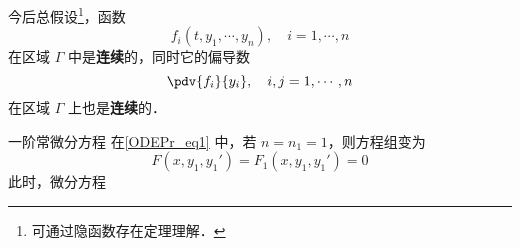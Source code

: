 今后总假设\footnote{可通过隐函数存在定理理解．}，函数 
\begin{equation}
f_i(t,y_1,\cdots,y_n),\quad i=1,\cdots,n
\end{equation}
在区域 $\Gamma$ 中是\textbf{连续}的，同时它的偏导数
\begin{equation}
\pdv{f_i}{y_i},\quad i,j=1,\cdots,n
\end{equation}
在区域 $\Gamma$ 上也是\textbf{连续}的．
\begin{example}{一阶常微分方程}
在\autoref{ODEPr_eq1} 中，若 $n=n_1=1$，则方程组变为
\begin{equation}
F(x,y_1,y_1')=F_1(x,y_1,y_1')=0
\end{equation}
此时，微分方程
\end{example}